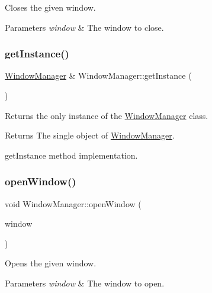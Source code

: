 Closes the given window.


\begin{DoxyParams}{Parameters}
{\em window} & The window to close. \\
\hline
\end{DoxyParams}
\mbox{\label{class_window_manager_a4f5e8cf13cbe4f2d80f3dbcf7f3fb2eb}} 
\subsubsection{\texorpdfstring{get\+Instance()}{getInstance()}}
{\footnotesize\ttfamily \mbox{\hyperlink{class_window_manager}{Window\+Manager}} \& Window\+Manager\+::get\+Instance (\begin{DoxyParamCaption}{ }\end{DoxyParamCaption})\hspace{0.3cm}{\ttfamily [static]}}

Returns the only instance of the \mbox{\hyperlink{class_window_manager}{Window\+Manager}} class.

\begin{DoxyReturn}{Returns}
The single object of \mbox{\hyperlink{class_window_manager}{Window\+Manager}}.
\end{DoxyReturn}
get\+Instance method implementation. \mbox{\label{class_window_manager_a2dabddb740954a724f051bad50a15979}} 
\subsubsection{\texorpdfstring{open\+Window()}{openWindow()}}
{\footnotesize\ttfamily void Window\+Manager\+::open\+Window (\begin{DoxyParamCaption}\item[{Q\+Widget $\ast$}]{window }\end{DoxyParamCaption})}

Opens the given window.


\begin{DoxyParams}{Parameters}
{\em window} & The window to open. \\
\hline
\end{DoxyParams}
\mbox{\label{class_window_manager_aece6fb478e72bb3c3bf33ffe6fb4ed38}} 
